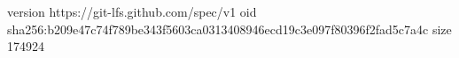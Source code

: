 version https://git-lfs.github.com/spec/v1
oid sha256:b209e47c74f789be343f5603ca0313408946ecd19c3e097f80396f2fad5c7a4c
size 174924
